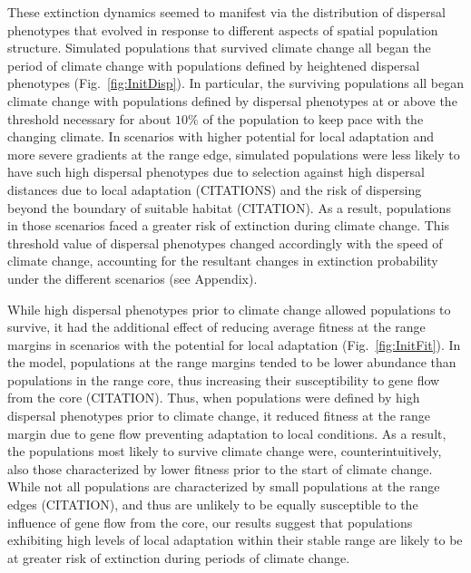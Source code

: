 \documentclass[11pt, oneside]{article}
\begin{document}
These extinction dynamics seemed to manifest via the distribution of dispersal phenotypes that evolved in response to different aspects of spatial population structure. Simulated populations that survived climate change all began the period of climate change with populations defined by heightened dispersal phenotypes (Fig.~\ref{fig:InitDisp}). In particular, the surviving populations all began climate change with populations defined by dispersal phenotypes at or above the threshold necessary for about $10\%$ of the population to keep pace with the changing climate. In scenarios with higher potential for local adaptation and more severe gradients at the range edge, simulated populations were less likely to have such high dispersal phenotypes due to selection against high dispersal distances due to local adaptation (CITATIONS) and the risk of dispersing beyond the boundary of suitable habitat (CITATION). As a result, populations in those scenarios faced a greater risk of extinction during climate change. This threshold value of dispersal phenotypes changed accordingly with the speed of climate change, accounting for the resultant changes in extinction probability under the different scenarios (see Appendix).

While high dispersal phenotypes prior to climate change allowed populations to survive, it had the additional effect of reducing average fitness at the range margins in scenarios with the potential for local adaptation (Fig.~\ref{fig:InitFit}). In the model, populations at the range margins tended to be lower abundance than populations in the range core, thus increasing their susceptibility to gene flow from the core (CITATION). Thus, when populations were defined by high dispersal phenotypes prior to climate change, it reduced fitness at the range margin due to gene flow preventing adaptation to local conditions. As a result, the populations most likely to survive climate change were, counterintuitively, also those characterized by lower fitness prior to the start of climate change. While not all populations are characterized by small populations at the range edges (CITATION), and thus are unlikely to be equally susceptible to the influence of gene flow from the core, our results suggest that populations exhibiting high levels of local adaptation within their stable range are likely to be at greater risk of extinction during periods of climate change.
\end{document}
